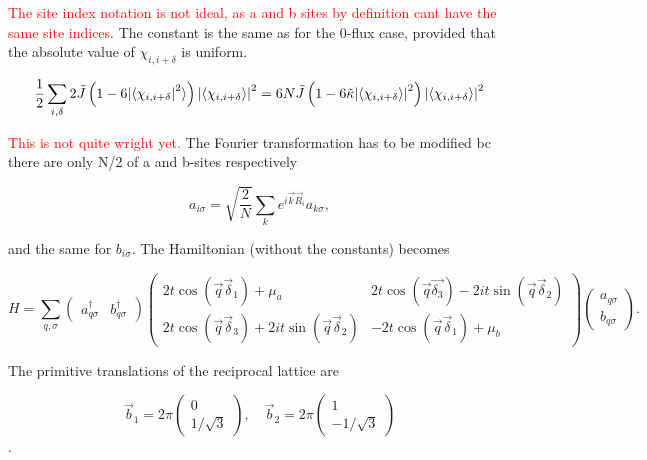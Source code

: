 \documentclass[../../../main.tex]{subfiles}
\begin{document}
\textcolor{red}{The site index notation is not ideal, as a and b sites by definition cant have the same site indices.} The constant is the same as for the 0-flux case, provided that the absolute value of $\chi_{i,i+\delta}$ is uniform.

\begin{align}
	\frac12\sum_{i,\delta} 2\tilde{J}\left(1-6\abs{\langle\chi_{i,i+\delta}}^2\rangle\right)\abs{\langle\chi_{i,i+\delta}\rangle}^2 = 6N \tilde{J}\left(1-6\tilde{\kappa}\abs{\langle\chi_{i,i+\delta}\rangle}^2\right)\abs{\langle\chi_{i,i+\delta}\rangle}^2
\end{align}

\textcolor{red}{This is not quite wright yet.} The Fourier transformation has to be modified bc there are only N/2 of a and b-sites respectively

\begin{equation}
	a_{i\sigma} = \sqrt{\frac{2}{N}}\sum_k e^{i\vec{k}\vec{R}_i}a_{k\sigma},
\end{equation}

and the same for $b_{i\sigma}$. The Hamiltonian (without the constants) becomes

\begin{equation}
H = 
\sum_{q,\sigma} 
\begin{pmatrix}
a_{q\sigma}^\dagger & b_{q\sigma}^\dagger 
\end{pmatrix}
\begin{pmatrix}
2t\cos(\vec{q}\vec{\delta}_1) + \mu_a&  2t\cos(\vec{q}\vec{\delta_3}) - 2it \sin(\vec{q}\vec{\delta}_2) \\
2t\cos(\vec{q}\vec{\delta}_3)  + 2it \sin(\vec{q} \vec{\delta}_2) & -2t\cos(\vec{q}\vec{\delta}_1) + \mu_b
\end{pmatrix}
\begin{pmatrix}
a_{q\sigma} \\
b_{q\sigma}
\end{pmatrix}
.
\end{equation}


The primitive translations of the reciprocal lattice are 

\begin{equation}
	\vec{b}_1=2\pi
	\begin{pmatrix}
 		0 \\
		1/\sqrt{3}
	\end{pmatrix}, \quad 
	\vec{b}_2=2\pi
	\begin{pmatrix}
		1 \\
		-1/\sqrt{3}
	\end{pmatrix}
\end{equation}.
\end{document}

